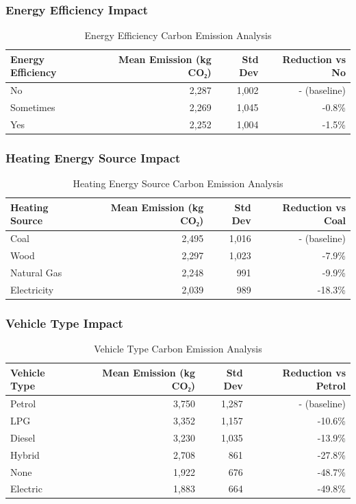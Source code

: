\documentclass[12pt,a4paper]{article}
\begin{document}
\subsubsection{Energy Efficiency Impact}
\begin{table}[H]
\centering
\caption{Energy Efficiency Carbon Emission Analysis}
\begin{tabular}{@{}lrrr@{}}
\toprule
Energy Efficiency & Mean Emission (kg CO₂) & Std Dev & Reduction vs No \\
\midrule
No & 2,287 & 1,002 & - (baseline) \\
Sometimes & 2,269 & 1,045 & -0.8\% \\
Yes & 2,252 & 1,004 & -1.5\% \\
\bottomrule
\end{tabular}
\end{table}

\subsubsection{Heating Energy Source Impact}
\begin{table}[H]
\centering
\caption{Heating Energy Source Carbon Emission Analysis}
\begin{tabular}{@{}lrrr@{}}
\toprule
Heating Source & Mean Emission (kg CO₂) & Std Dev & Reduction vs Coal \\
\midrule
Coal & 2,495 & 1,016 & - (baseline) \\
Wood & 2,297 & 1,023 & -7.9\% \\
Natural Gas & 2,248 & 991 & -9.9\% \\
Electricity & 2,039 & 989 & -18.3\% \\
\bottomrule
\end{tabular}
\end{table}

\subsubsection{Vehicle Type Impact}
\begin{table}[H]
\centering
\caption{Vehicle Type Carbon Emission Analysis}
\begin{tabular}{@{}lrrr@{}}
\toprule
Vehicle Type & Mean Emission (kg CO₂) & Std Dev & Reduction vs Petrol \\
\midrule
Petrol & 3,750 & 1,287 & - (baseline) \\
LPG & 3,352 & 1,157 & -10.6\% \\
Diesel & 3,230 & 1,035 & -13.9\% \\
Hybrid & 2,708 & 861 & -27.8\% \\
None & 1,922 & 676 & -48.7\% \\
Electric & 1,883 & 664 & -49.8\% \\
\bottomrule
\end{tabular}
\end{table}
\end{document}
